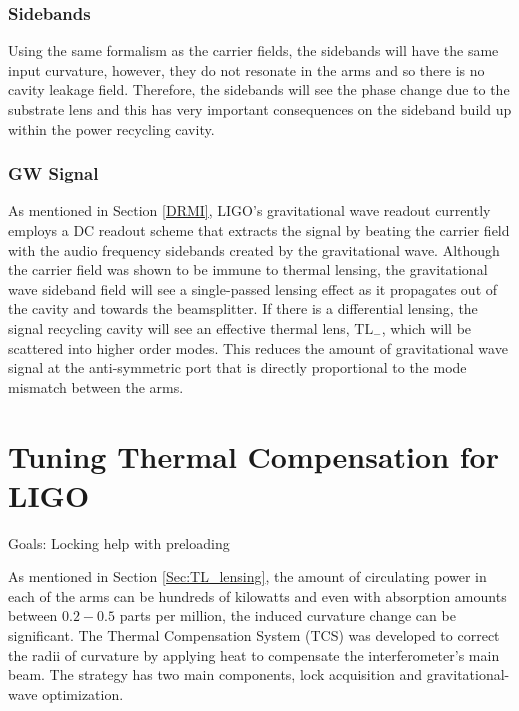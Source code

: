 		\subsubsection{Sidebands}
		Using the same formalism as the carrier fields, the sidebands will have the same input curvature, however, they do not resonate in the arms and so there is no cavity leakage field.  Therefore, the sidebands will see the phase change due to the substrate lens and this has very important consequences on the sideband build up within the power recycling cavity.
		
		\subsubsection{GW Signal}
		As mentioned in Section \ref{DRMI}, LIGO's gravitational wave readout currently employs a DC readout scheme that extracts the signal by beating the carrier field with the audio frequency sidebands created by the gravitational wave.  Although the carrier field was shown to be immune to thermal lensing, the gravitational wave sideband field will see a single-passed lensing effect as it propagates out of the cavity and towards the beamsplitter.  If there is a differential lensing, the signal recycling cavity will see an effective thermal lens, $\text{TL}_{-}$, which will be scattered into higher order modes.  This reduces the amount of gravitational wave signal at the anti-symmetric port that is directly proportional to the mode mismatch between the arms.
	
	\section{Tuning Thermal Compensation for LIGO}
	Goals: Locking help with preloading
	
	\cite{Lawrence_TCS}
	
	\cite{AWC_current}
	
	\cite{Strain_TL}
	
	\cite{Vinet_Thermal_Issues}
	
	As mentioned in Section \ref{Sec:TL_lensing}, the amount of circulating power in each of the arms can be hundreds of kilowatts and even with absorption amounts between $0.2-0.5$ parts per million, the induced curvature change can be significant.  The Thermal Compensation System (TCS) was developed to correct the radii of curvature by applying heat to compensate the interferometer's main beam.  The strategy has two main components, lock acquisition and gravitational-wave optimization.
	
